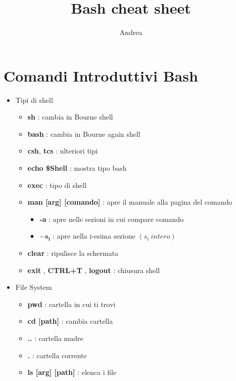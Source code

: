 \documentclass{article}
\title{Bash cheat sheet}
\author{Andrea}
\begin{document}
\maketitle

\newpage

\section{Comandi Introduttivi Bash}
\begin{itemize} %

    \item Tipi di shell
    
        \begin{itemize} %
        
        \item \textbf{sh} : cambia in Bourne shell
        \item \textbf{bash} :  cambia in Bourne again shell
        \item \textbf{csh}, \textbf{tcs} : ulteriori tipi
        \item \textbf{echo \$Shell} : mostra tipo bash
        \item \textbf{exec} : tipo di shell
        \item \textbf{man [arg] [comando]} : apre il manuale alla pagina del comando
            \begin{itemize}
                \item \textbf{-a} : apre nelle sezioni in cui compare comando
                \item $\mathbf{ -s_{i} }$ : apre nella i-esima sezione $(s_{i} \ intero)$
            \end{itemize}
        \item \textbf{clear} : ripulisce la schermata
        \item \textbf{exit} , \textbf{CTRL+T} , \textbf{logout} : chiusura shell
        
        \end{itemize} %
        
    \item File System
    
        \begin{itemize} %
        
            \item \textbf{pwd } : cartella in cui ti trovi
            \item \textbf{ cd [path] } : cambia cartella
            \item \textbf{..} : cartella madre
            \item \textbf{.} : cartella corrente
            \item \textbf{ls [arg] [path] } : elenca i file
            

\end{itemize}
\end{itemize}
\end{document}
